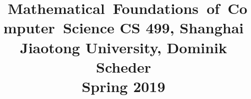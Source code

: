 

\date{}

\title{
\hbox{  Mathematical Foundations of Computer Science}
  \vspace{3mm}
{\normalsize CS 499,	Shanghai Jiaotong University,  Dominik Scheder\\
Spring 2019}
}



%
%
